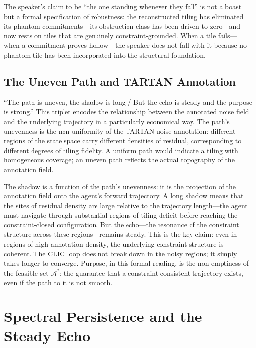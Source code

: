 \documentclass[12pt, a4paper]{article}
\begin{document}
The speaker's claim to be ``the one standing whenever they fall'' is not a boast but a formal specification of robustness: the reconstructed tiling has eliminated its phantom commitments---its obstruction class has been driven to zero---and now rests on tiles that are genuinely constraint-grounded. When a tile fails---when a commitment proves hollow---the speaker does not fall with it because no phantom tile has been incorporated into the structural foundation.

\subsection{The Uneven Path and TARTAN Annotation}

``The path is uneven, the shadow is long / But the echo is steady and the purpose is strong.'' This triplet encodes the relationship between the annotated noise field and the underlying trajectory in a particularly economical way. The path's unevenness is the non-uniformity of the TARTAN noise annotation: different regions of the state space carry different densities of residual, corresponding to different degrees of tiling fidelity. A uniform path would indicate a tiling with homogeneous coverage; an uneven path reflects the actual topography of the annotation field.

The shadow is a function of the path's unevenness: it is the projection of the annotation field onto the agent's forward trajectory. A long shadow means that the sites of residual density are large relative to the trajectory length---the agent must navigate through substantial regions of tiling deficit before reaching the constraint-closed configuration. But the echo---the resonance of the constraint structure across these regions---remains steady. This is the key claim: even in regions of high annotation density, the underlying constraint structure is coherent. The CLIO loop does not break down in the noisy regions; it simply takes longer to converge. Purpose, in this formal reading, is the non-emptiness of the feasible set $\mathcal{A}^*$: the guarantee that a constraint-consistent trajectory exists, even if the path to it is not smooth.

\section{Spectral Persistence and the Steady Echo}
\end{document}
